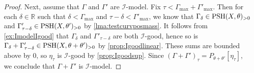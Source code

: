 \begin{proof}
    Next, assume that $\Gamma$ and $\Gamma'$ are $\mathcal{I}$-model. Fix $\tau<\Gamma_{\max}+\Gamma'_{\max}$. Then for each $\delta\in \mathbb{R}$ such that $\delta<\Gamma_{\max}$ and $\tau-\delta<\Gamma'_{\max}$, we know that $\Gamma_\delta\in \mathrm{PSH}(X,\theta)_{>0}$ and $\Gamma'_{\tau-\delta}\in \mathrm{PSH}(X,\theta')_{>0}$ by \cref{lma:testcurvposmass}.
    It follows from \cref{ex:ImodelIgood} that $\Gamma_\delta$ and $\Gamma'_{\tau-\delta}$ are both $\mathcal{I}$-good, hence so is $\Gamma_\delta+\Gamma'_{\tau-\delta}\in \mathrm{PSH}(X,\theta+\theta')_{>0}$ by \cref{prop:Igoodlinear}. These sums are bounded above by $0$, so $\eta_{\tau}$ is $\mathcal{I}$-good by \cref{prop:Igoodsup}. Since $(\Gamma+\Gamma')_\tau=P_{\theta+\theta'}[\eta_\tau]$, we conclude that $\Gamma+\Gamma'$ is $\mathcal{I}$-model.
\end{proof}


